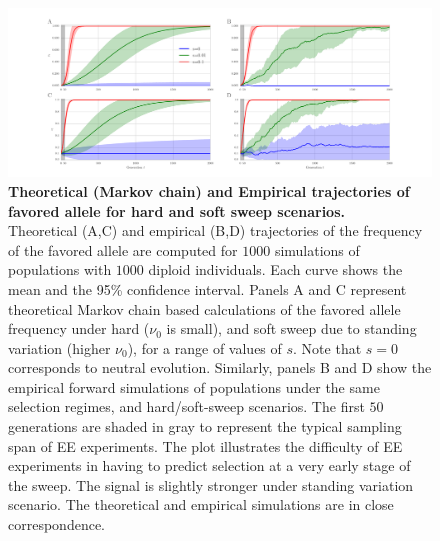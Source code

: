 \begin{figure}[H]
	\includegraphics[trim=1in 0.1in 1in 
	0.1in,clip,width=\textwidth]{figures/AF.pdf}
	\caption{{\bf Theoretical (Markov chain) and Empirical
            trajectories of favored allele for hard and soft sweep
            scenarios.}\\  Theoretical (A,C) and empirical (B,D) trajectories 
            of 
            the
          frequency of the favored allele are computed for $1000$ 
          simulations of populations with 
          $1000$ diploid individuals. Each curve shows the mean and the 95\% 
          confidence
          interval.  Panels A and C represent theoretical Markov chain
          based calculations of the favored allele frequency under
          hard ($\nu_0$ is small), and soft sweep due to standing
          variation (higher $\nu_0$), for a range of values of
          $s$. Note that $s=0$ corresponds to neutral
          evolution. Similarly, panels B and D show the empirical
          forward simulations of populations under the same selection
          regimes, and hard/soft-sweep scenarios. The first $50$
          generations are shaded in gray to represent the typical
          sampling span of EE experiments. The plot illustrates the
          difficulty of EE experiments in having to predict selection
          at a very early stage of the sweep. The signal is slightly
          stronger under standing variation scenario. The theoretical
          and empirical simulations are in close correspondence. }
	\label{fig:sweep}
\end{figure}




